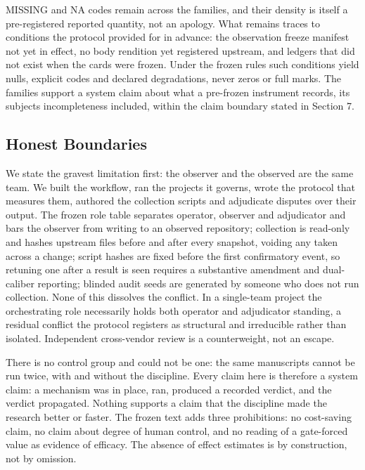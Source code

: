 \documentclass[
  english,
]{article}
\begin{document}
MISSING and NA codes remain across the families, and their density is itself a pre-registered reported quantity, not an apology. What remains traces to conditions the protocol provided for in advance: the observation freeze manifest not yet in effect, no body rendition yet registered upstream, and ledgers that did not exist when the cards were frozen. Under the frozen rules such conditions yield nulls, explicit codes and declared degradations, never zeros or full marks. The families support a system claim about what a pre-frozen instrument records, its subjects\textquotesingle{} incompleteness included, within the claim boundary stated in Section 7.

\subsection{Honest Boundaries}\label{honest-boundaries}

We state the gravest limitation first: the observer and the observed are the same team. We built the workflow, ran the projects it governs, wrote the protocol that measures them, authored the collection scripts and adjudicate disputes over their output. The frozen role table separates operator, observer and adjudicator and bars the observer from writing to an observed repository; collection is read-only and hashes upstream files before and after every snapshot, voiding any taken across a change; script hashes are fixed before the first confirmatory event, so retuning one after a result is seen requires a substantive amendment and dual-caliber reporting; blinded audit seeds are generated by someone who does not run collection. None of this dissolves the conflict. In a single-team project the orchestrating role necessarily holds both operator and adjudicator standing, a residual conflict the protocol registers as structural and irreducible rather than isolated. Independent cross-vendor review is a counterweight, not an escape.

There is no control group and could not be one: the same manuscripts cannot be run twice, with and without the discipline. Every claim here is therefore a system claim: a mechanism was in place, ran, produced a recorded verdict, and the verdict propagated. Nothing supports a claim that the discipline made the research better or faster. The frozen text adds three prohibitions: no cost-saving claim, no claim about degree of human control, and no reading of a gate-forced value as evidence of efficacy. The absence of effect estimates is by construction, not by omission.
\end{document}
